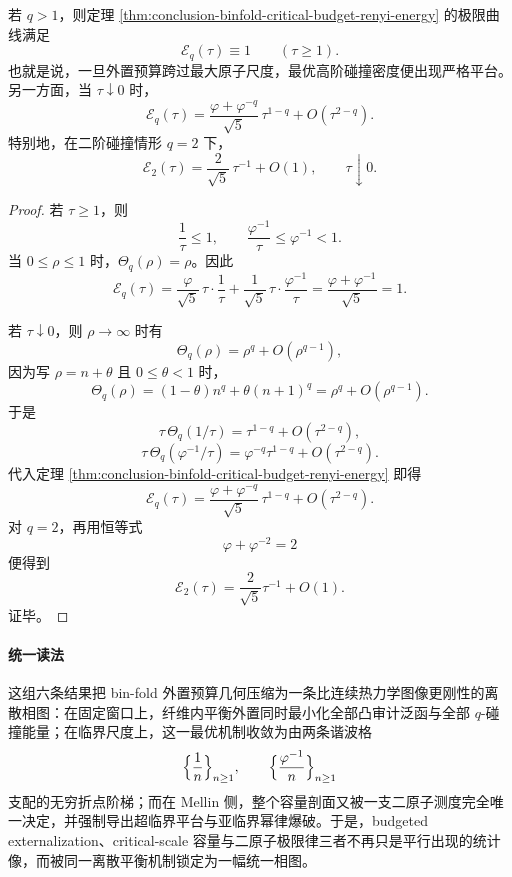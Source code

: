 \begin{theorem}[超临界精确平台与亚临界幂律爆破]\label{thm:conclusion-supercritical-plateau-subcritical-power-law}
若 \(q>1\)，则定理 \ref{thm:conclusion-binfold-critical-budget-renyi-energy} 的极限曲线满足
\[
\mathcal E_q(\tau)\equiv 1
\qquad (\tau\ge 1).
\]
也就是说，一旦外置预算跨过最大原子尺度，最优高阶碰撞密度便出现严格平台。另一方面，当 \(\tau\downarrow 0\) 时，
\[
\mathcal E_q(\tau)
=
\frac{\varphi+\varphi^{-q}}{\sqrt5}\,\tau^{1-q}
+
O(\tau^{2-q}).
\]
特别地，在二阶碰撞情形 \(q=2\) 下，
\[
\mathcal E_2(\tau)
=
\frac{2}{\sqrt5}\,\tau^{-1}+O(1),
\qquad
\tau\downarrow 0.
\]
\end{theorem}
\begin{proof}
若 \(\tau\ge 1\)，则
\[
\frac1\tau\le 1,
\qquad
\frac{\varphi^{-1}}{\tau}\le \varphi^{-1}<1.
\]
当 \(0\le \rho\le 1\) 时，\(\Theta_q(\rho)=\rho\)。因此
\[
\mathcal E_q(\tau)
=
\frac{\varphi}{\sqrt5}\,\tau\cdot \frac1\tau
+
\frac1{\sqrt5}\,\tau\cdot \frac{\varphi^{-1}}{\tau}
=
\frac{\varphi+\varphi^{-1}}{\sqrt5}
=1.
\]

若 \(\tau\downarrow 0\)，则 \(\rho\to\infty\) 时有
\[
\Theta_q(\rho)=\rho^q+O(\rho^{q-1}),
\]
因为写 \(\rho=n+\theta\) 且 \(0\le \theta<1\) 时，
\[
\Theta_q(\rho)=(1-\theta)n^q+\theta(n+1)^q
=
\rho^q+O(\rho^{q-1}).
\]
于是
\[
\tau\,\Theta_q(1/\tau)=\tau^{1-q}+O(\tau^{2-q}),
\]
\[
\tau\,\Theta_q(\varphi^{-1}/\tau)=\varphi^{-q}\tau^{1-q}+O(\tau^{2-q}).
\]
代入定理 \ref{thm:conclusion-binfold-critical-budget-renyi-energy} 即得
\[
\mathcal E_q(\tau)
=
\frac{\varphi+\varphi^{-q}}{\sqrt5}\,\tau^{1-q}
+
O(\tau^{2-q}).
\]
对 \(q=2\)，再用恒等式
\[
\varphi+\varphi^{-2}=2
\]
便得到
\[
\mathcal E_2(\tau)=\frac{2}{\sqrt5}\tau^{-1}+O(1).
\]
证毕。
\end{proof}

\paragraph{统一读法}
这组六条结果把 bin-fold 外置预算几何压缩为一条比连续热力学图像更刚性的离散相图：在固定窗口上，纤维内平衡外置同时最小化全部凸审计泛函与全部 \(q\)-碰撞能量；在临界尺度上，这一最优机制收敛为由两条谐波格
\[
\Bigl\{\frac1n\Bigr\}_{n\ge 1},
\qquad
\Bigl\{\frac{\varphi^{-1}}{n}\Bigr\}_{n\ge 1}
\]
支配的无穷折点阶梯；而在 Mellin 侧，整个容量剖面又被一支二原子测度完全唯一决定，并强制导出超临界平台与亚临界幂律爆破。于是，budgeted externalization、critical-scale 容量与二原子极限律三者不再只是平行出现的统计像，而被同一离散平衡机制锁定为一幅统一相图。

\endinput
